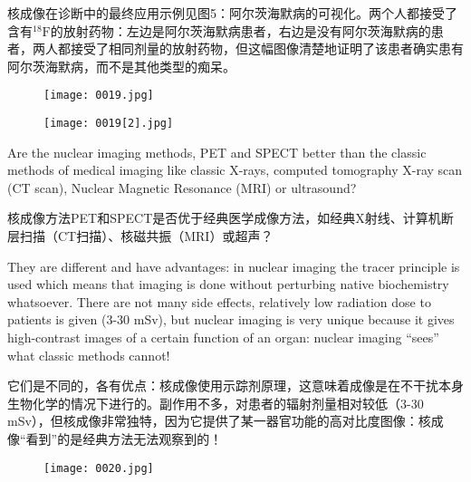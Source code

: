 \documentclass[dvipsnames, svgnames,a4paper,11pt]{article}
\begin{document}
核成像在诊断中的最终应用示例见图5：阿尔茨海默病的可视化。两个人都接受了含有${}^{18}\text{F}$的放射药物：左边是阿尔茨海默病患者，右边是没有阿尔茨海默病的患者，两人都接受了相同剂量的放射药物，但这幅图像清楚地证明了该患者确实患有阿尔茨海默病，而不是其他类型的痴呆。

\begin{figure}[htbp]
      \centering
      \texttt{[image: 0019.jpg]}
       \label{fig5}
  \end{figure}

  \begin{figure}[H]
      \centering
      \texttt{[image: 0019[2].jpg]}
       \label{fig6}
  \end{figure}

Are the nuclear imaging methods, PET and SPECT better than the classic methods of medical imaging like classic X-rays, computed tomography X-ray scan (CT scan), Nuclear Magnetic Resonance (MRI) or ultrasound?

核成像方法PET和SPECT是否优于经典医学成像方法，如经典X射线、计算机断层扫描（CT扫描）、核磁共振（MRI）或超声？

They are different and have advantages: in nuclear imaging the tracer principle is used which means that imaging is done without perturbing native biochemistry whatsoever. There are not many side effects, relatively low radiation dose to patients is given (3-30 mSv), but nuclear imaging is very unique because it gives high-contrast images of a certain function of an organ: nuclear imaging “sees” what classic methods cannot!

它们是不同的，各有优点：核成像使用示踪剂原理，这意味着成像是在不干扰本身生物化学的情况下进行的。副作用不多，对患者的辐射剂量相对较低（3-30 mSv），但核成像非常独特，因为它提供了某一器官功能的高对比度图像：核成像“看到”的是经典方法无法观察到的！

\begin{figure}[htbp]
      \centering
      \texttt{[image: 0020.jpg]}
       \label{fig7}
  \end{figure}
\end{document}
